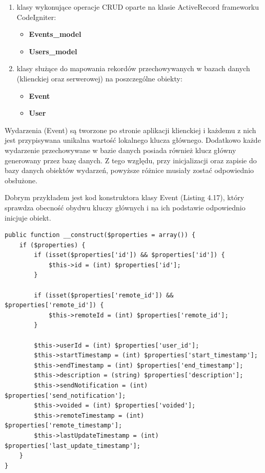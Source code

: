 \begin{enumerate}
\item klasy wykonujące operacje CRUD oparte na klasie ActiveRecord\cite{ciActiveRecord} frameworku CodeIgniter:
\begin{itemize}
\item \textbf{Events\_model}
\item \textbf{Users\_model}
\end{itemize}
\item klasy służące do mapowania rekordów przechowywanych w bazach danych (klienckiej oraz serwerowej) na poszczególne obiekty:
\begin{itemize}
\item \textbf{Event}
\item \textbf{User}
\end{itemize}
\end{enumerate}

Wydarzenia (Event) są tworzone po stronie aplikacji klienckiej i każdemu z nich jest przypisywana unikalna wartość lokalnego klucza głównego. Dodatkowo każde wydarzenie przechowywane w bazie danych posiada również klucz główny generowany przez bazę danych. Z tego względu, przy inicjalizacji oraz zapisie do bazy danych obiektów wydarzeń, powyższe różnice musiały zostać odpowiednio obsłużone.

Dobrym przykładem jest kod konstruktora klasy Event (Listing 4.17), który sprawdza obecność obydwu kluczy głównych i na ich podstawie odpowiednio inicjuje obiekt.

\begin{lstlisting}[style=php, caption=Fragment konstruktora klasy Event., label=amb, captionpos=b]
public function __construct($properties = array()) {
    if ($properties) {
        if (isset($properties['id']) && $properties['id']) {
            $this->id = (int) $properties['id'];
        }

        if (isset($properties['remote_id']) && $properties['remote_id']) {
            $this->remoteId = (int) $properties['remote_id'];
        }

        $this->userId = (int) $properties['user_id'];
        $this->startTimestamp = (int) $properties['start_timestamp'];
        $this->endTimestamp = (int) $properties['end_timestamp'];
        $this->description = (string) $properties['description'];
        $this->sendNotification = (int) $properties['send_notification'];
        $this->voided = (int) $properties['voided'];
        $this->remoteTimestamp = (int) $properties['remote_timestamp'];
        $this->lastUpdateTimestamp = (int) $properties['last_update_timestamp'];
    }
}
\end{lstlisting}

